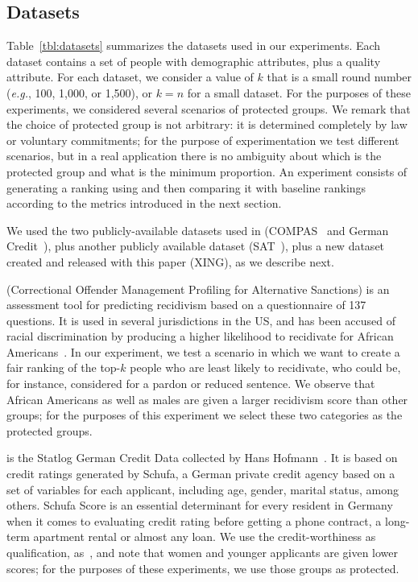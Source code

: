 \subsection{Datasets}\label{sec:experiments-datasets}

Table~\ref{tbl:datasets} summarizes the datasets used in our experiments.
%
Each dataset contains a set of people with demographic attributes, plus a quality attribute.
%
For each dataset, we consider a value of $k$ that is a small round number  ({\em e.g.}, 100, 1,000, or 1,500), or $k=n$ for a small dataset.
%
For the purposes of these experiments, we considered several scenarios of protected groups.
%
We remark that the choice of protected group is not arbitrary: it is determined completely by law or voluntary commitments; for the purpose of experimentation we test different scenarios, but in a real application there is no ambiguity about which is the protected group and what is the minimum proportion.
%
An experiment consists of generating a ranking using \algoFAIR and then comparing it with baseline rankings according to the metrics introduced in the next section.

We used the two publicly-available datasets used in \cite{yang2016measuring} (COMPAS~\cite{angwin_2016_machine} and German Credit~\cite{lichman_2013_uci}), plus another publicly available dataset (SAT~\cite{sat_2014}), plus a new dataset created and released with this paper (XING), as we describe next.

 (Correctional Offender Management Profiling for Alternative Sanctions) is an assessment tool for predicting recidivism based on a questionnaire of 137 questions. It is used in several jurisdictions in the US, and has been accused of racial discrimination by producing a higher likelihood to recidivate for African Americans~\cite{angwin_2016_machine}.
%
In our experiment, we test a scenario in which we want to create a fair ranking of the top-$k$ people who are least likely to recidivate, who could be, for instance, considered for a pardon or reduced sentence.
%
We observe that African Americans as well as males are given a larger recidivism score than other groups; for the purposes of this experiment we select these two categories as the protected groups.

 is the Statlog German Credit Data collected by Hans Hofmann~\cite{lichman_2013_uci}.
%
It is based on credit ratings generated by Schufa, a German private credit agency based on a set of variables for each applicant, including age, gender, marital status, among others. Schufa Score is an essential determinant for every resident in Germany when it comes to evaluating credit rating before getting a phone contract, a long-term apartment rental or almost any loan.
%
We use the credit-worthiness as qualification, as~\cite{yang2016measuring}, and note that women and younger applicants are given lower scores; for the purposes of these experiments, we use those groups as protected.

